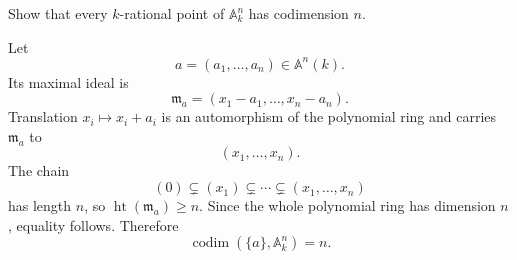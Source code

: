 \begin{problem}\label{prob:vi31-06}
Show that every \(k\)-rational point of \(\mathbb A^n_k\) has codimension \(n\).
\end{problem}

\ifdefined\FullProblemDossiers
\begin{solution}
Let
\[
a=(a_1,\ldots,a_n)\in\mathbb A^n(k).
\]
Its maximal ideal is
\[
\mathfrak m_a=(x_1-a_1,\ldots,x_n-a_n).
\]
Translation \(x_i\mapsto x_i+a_i\) is an automorphism of the polynomial ring and carries \(\mathfrak m_a\) to
\[
(x_1,\ldots,x_n).
\]
The chain
\[
(0)\subsetneq(x_1)\subsetneq\cdots\subsetneq(x_1,\ldots,x_n)
\]
has length \(n\), so \(\operatorname{ht}(\mathfrak m_a)\ge n\). Since the whole polynomial ring has dimension
\(n\), equality follows. Therefore
\[
\boxed{
\operatorname{codim}(\{a\},\mathbb A^n_k)=n.
}
\]
\end{solution}
\fi
